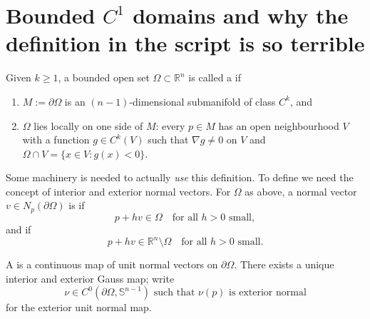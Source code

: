 
\section{Bounded \texorpdfstring{$C^1$}{C1} domains and why the definition in the script is so terrible}
\label{sec:bounded_c1_domains}

\begin{definition}
\label{def:bounded_ck_domain}
Given $k \geq 1$, a bounded open set $\Omega \subset \mathbb{R}^n$ is called a
 if
\begin{enumerate}[label=\textbf{(\alph*)}]
  \item $M := \partial\Omega$ is an $(n-1)$-dimensional submanifold of class $C^k$, and
  \item $\Omega$ lies locally on one side of $M$: every $p \in M$ has an open neighbourhood $V$
    with a function $g \in C^k(V)$ such that $\nabla g \neq 0$ on $V$ and
    $\Omega \cap V = \{x \in V : g(x) < 0\}$.
\end{enumerate}
\end{definition}

Some machinery is needed to actually \emph{use} this definition. To define  we need the concept of interior and exterior
normal vectors. For $\Omega$ as above, a normal vector $v \in N_p(\partial\Omega)$ is
 if
\[p + hv \in \Omega \quad \text{for all } h>0 \text{ small},\]
and  if
\[p + hv \in \mathbb{R}^n\setminus\Omega \quad \text{for all } h>0 \text{ small}.\]

A  is a continuous map of unit normal vectors on $\partial\Omega$. There
exists a unique interior and exterior Gauss map; write
\[\nu \in C^0(\partial\Omega, \mathbb{S}^{n-1}) \text{ such that } \nu(p) \text{ is exterior
  normal}\]
for the exterior unit normal map.

